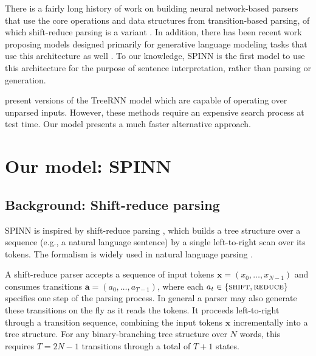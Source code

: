 \documentclass[11pt]{article}
\newcommand{\shift}{\textsc{shift}}
\newcommand{\reduce}{\textsc{reduce}}
\begin{document}
There is a fairly long history of work on building neural network-based parsers that use the core operations and data structures from transition-based parsing, of which shift-reduce parsing is a variant \citep{henderson2004discriminative,emami2005neural,titov2010latent,chen2014,buys2generative,dyer-EtAl:2015:ACL-IJCNLP,kiperwasser2016easy}. In addition, there has been recent work proposing models designed primarily for generative language modeling tasks that use this architecture as well \citep{zhang2016top,dyer2016rnn}. To our knowledge, SPINN is the first model to use this architecture for the purpose of sentence interpretation, rather than parsing or generation.  %

\citet{socher2011parsing,socher2011semi} present versions of the TreeRNN model which are capable of operating over unparsed inputs. However, these methods require an expensive search process at test time. Our model presents a much faster alternative approach.

\section{Our model: SPINN}

\subsection{Background: Shift-reduce parsing}

SPINN is inspired by shift-reduce parsing \citep{aho1972theory}, which builds a tree structure over a sequence (e.g., a natural language sentence) by a single left-to-right scan over its tokens. The formalism is widely used in natural language parsing \citep[e.g.,][]{shieber:1983:ACL,nivre2003efficient}.

A shift-reduce parser accepts a sequence of input tokens $\mathbf x = (x_0, \dots, x_{N-1})$ and consumes transitions $\mathbf a = (a_0, \dots, a_{T-1})$, where each $a_t \in \{\shift, \reduce\}$ specifies one step of the parsing process. In general a parser may also generate these transitions on the fly as it reads the tokens. It proceeds left-to-right through a transition sequence, combining the input tokens $\mathbf x$ incrementally into a tree structure. For any binary-branching tree structure over $N$ words, this requires $T=2N-1$ transitions through a total of $T+1$ states.
\end{document}
